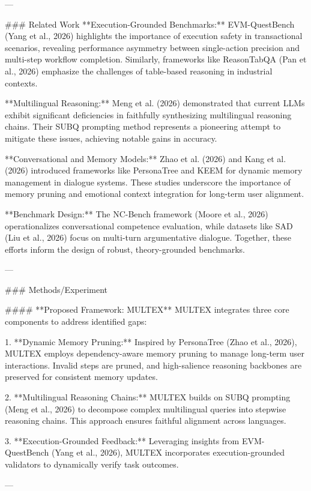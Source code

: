 ---

### Related Work  
**Execution-Grounded Benchmarks:**  
EVM-QuestBench (Yang et al., 2026) highlights the importance of execution safety in transactional scenarios, revealing performance asymmetry between single-action precision and multi-step workflow completion. Similarly, frameworks like ReasonTabQA (Pan et al., 2026) emphasize the challenges of table-based reasoning in industrial contexts.

**Multilingual Reasoning:**  
Meng et al. (2026) demonstrated that current LLMs exhibit significant deficiencies in faithfully synthesizing multilingual reasoning chains. Their SUBQ prompting method represents a pioneering attempt to mitigate these issues, achieving notable gains in accuracy.

**Conversational and Memory Models:**  
Zhao et al. (2026) and Kang et al. (2026) introduced frameworks like PersonaTree and KEEM for dynamic memory management in dialogue systems. These studies underscore the importance of memory pruning and emotional context integration for long-term user alignment.

**Benchmark Design:**  
The NC-Bench framework (Moore et al., 2026) operationalizes conversational competence evaluation, while datasets like SAD (Liu et al., 2026) focus on multi-turn argumentative dialogue. Together, these efforts inform the design of robust, theory-grounded benchmarks.

---

### Methods/Experiment  

#### **Proposed Framework: MULTEX**  
MULTEX integrates three core components to address identified gaps:

1. **Dynamic Memory Pruning:**  
   Inspired by PersonaTree (Zhao et al., 2026), MULTEX employs dependency-aware memory pruning to manage long-term user interactions. Invalid steps are pruned, and high-salience reasoning backbones are preserved for consistent memory updates.

2. **Multilingual Reasoning Chains:**  
   MULTEX builds on SUBQ prompting (Meng et al., 2026) to decompose complex multilingual queries into stepwise reasoning chains. This approach ensures faithful alignment across languages.

3. **Execution-Grounded Feedback:**  
   Leveraging insights from EVM-QuestBench (Yang et al., 2026), MULTEX incorporates execution-grounded validators to dynamically verify task outcomes.

---

